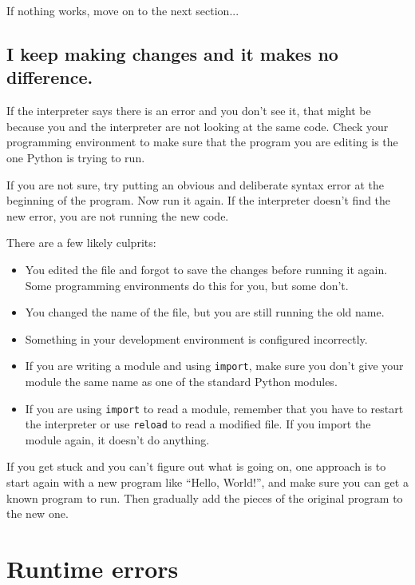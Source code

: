 If nothing works, move on to the next section...


\subsection{I keep making changes and it makes no difference.}

If the interpreter says there is an error and you don't see it, that
might be because you and the interpreter are not looking at the same
code.  Check your programming environment to make sure that the
program you are editing is the one Python is trying to run.

If you are not sure, try putting an obvious and deliberate syntax
error at the beginning of the program.  Now run it again.  If the
interpreter doesn't find the new error, you are not running the
new code.

There are a few likely culprits:

\begin{itemize}

\item You edited the file and forgot to save the changes before
running it again.  Some programming environments do this
for you, but some don't.

\item You changed the name of the file, but you are still running
the old name.

\item Something in your development environment is configured
incorrectly.

\item If you are writing a module and using {\tt import},
make sure you don't give your module the same name as one
of the standard Python modules.

\item If you are using {\tt import} to read a module, remember
that you have to restart the interpreter or use {\tt reload}
to read a modified file.  If you import the module again, it
doesn't do anything.

\end{itemize}

If you get stuck and you can't figure out what is going on, one
approach is to start again with a new program like ``Hello, World!'',
and make sure you can get a known program to run.  Then gradually add
the pieces of the original program to the new one.


\section{Runtime errors}

